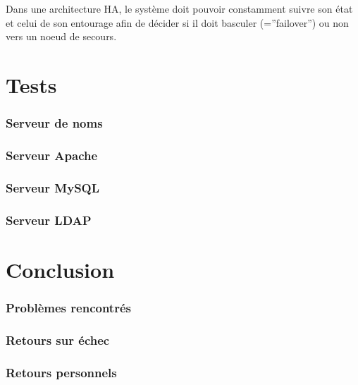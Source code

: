 \documentclass[11pt,a4paper]{report}
\begin{document}
            Dans une architecture HA, le système doit pouvoir constamment suivre son état et celui de son entourage afin de décider si il doit basculer (=''failover'') ou non vers un noeud de secours. 
            
    \part{Tests}
        \section{Serveur de noms}
        \section{Serveur Apache}
        \section{Serveur MySQL}
        \section{Serveur LDAP}
    \part{Conclusion}
        \section{Problèmes rencontrés}
        \section{Retours sur échec}
        \section{Retours personnels}
\end{document}
